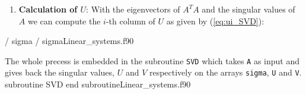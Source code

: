     \begin{enumerate}[resume]
    	\item \textbf{Calculation of $U$}: With the eigenvectors of $A^TA$ and the singular values of $A$ we can compute the $i$-th column of $U$ as given by (\ref{eq:ui_SVD}):
    \end{enumerate}
    \vspace{0.5cm} 
    {/ sigma}
    {/ sigma}{Linear_systems.f90}
    
    The whole precess is embedded in the subroutine \verb|SVD| which takes \verb|A| as input and gives back the singular values, $U$ and $V$ respectively on the arrays \verb|sigma|, \verb|U| and \verb|V|.
    \newpage
    \vspace{0.5cm} 
    {subroutine SVD}
    {end subroutine}{Linear_systems.f90}
    
  
    
    
    
    
    
    
    
    
    
    
    
    
         